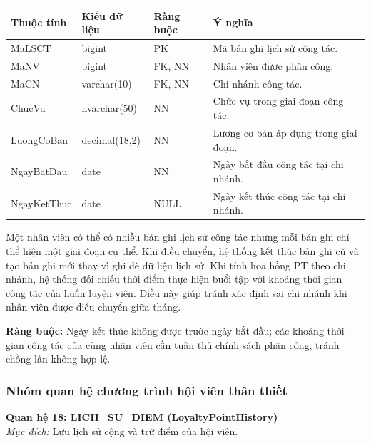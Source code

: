 \documentclass[11pt, a4paper]{article}
\begin{document}
\begin{small}
\begin{tabularx}{\textwidth}{| C{2.8cm} | C{2.4cm} | C{2.2cm} | Y |}
\hline
\textbf{Thuộc tính} & \textbf{Kiểu dữ liệu} & \textbf{Ràng buộc} & \textbf{Ý nghĩa} \\
\hline
MaLSCT & bigint & PK & Mã bản ghi lịch sử công tác. \\
\hline
MaNV & bigint & FK, NN & Nhân viên được phân công. \\
\hline
MaCN & varchar(10) & FK, NN & Chi nhánh công tác. \\
\hline
ChucVu & nvarchar(50) & NN & Chức vụ trong giai đoạn công tác. \\
\hline
LuongCoBan & decimal(18,2) & NN & Lương cơ bản áp dụng trong giai đoạn. \\
\hline
NgayBatDau & date & NN & Ngày bắt đầu công tác tại chi nhánh. \\
\hline
NgayKetThuc & date & NULL & Ngày kết thúc công tác tại chi nhánh. \\
\hline
\end{tabularx}
\end{small}

Một nhân viên có thể có nhiều bản ghi lịch sử công tác nhưng mỗi bản ghi chỉ thể hiện một giai đoạn cụ thể. Khi điều chuyển, hệ thống kết thúc bản ghi cũ và tạo bản ghi mới thay vì ghi đè dữ liệu lịch sử. Khi tính hoa hồng PT theo chi nhánh, hệ thống đối chiếu thời điểm thực hiện buổi tập với khoảng thời gian công tác của huấn luyện viên. Điều này giúp tránh xác định sai chi nhánh khi nhân viên được điều chuyển giữa tháng.

\textbf{Ràng buộc:} Ngày kết thúc không được trước ngày bắt đầu; các khoảng thời gian công tác của cùng nhân viên cần tuân thủ chính sách phân công, tránh chồng lấn không hợp lệ.

\subsubsection{Nhóm quan hệ chương trình hội viên thân thiết}

\textbf{Quan hệ 18: LICH\_SU\_DIEM (LoyaltyPointHistory)} \\
\textit{Mục đích:} Lưu lịch sử cộng và trừ điểm của hội viên.
\end{document}
